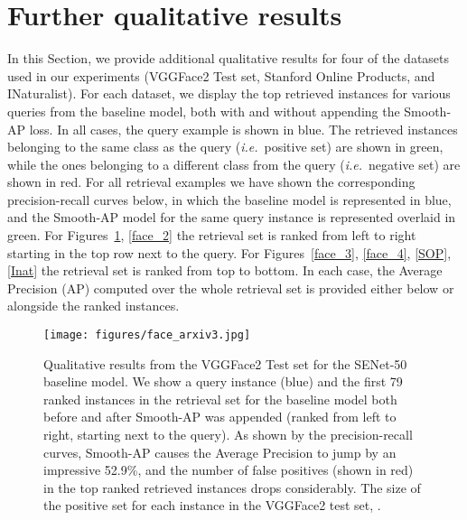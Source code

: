 \documentclass[runningheads]{llncs}
\newcommand\beforecaptions{\vspace{-3mm}}
\newcommand\aftercaptions{\vspace{-5mm}}
\providecommand{\ie}[0]{\emph{i.e.}}
\begin{document}
\section{Further qualitative results}
In this Section, we provide additional qualitative results for four of the datasets used in our experiments (VGGFace2 Test set, Stanford Online Products, and INaturalist). For each dataset, we display the top retrieved instances for various queries from the baseline model, both with and without appending the Smooth-AP loss.  
In all cases, the query example is shown in blue. The retrieved instances belonging to the same class as the query (\ie\ positive set) are shown in green, while the ones belonging to a different class from the query (\ie\ negative set) are shown in red. For all retrieval examples we have shown the corresponding precision-recall curves below, in which the baseline model is represented in blue, and the Smooth-AP model for the same query instance is represented overlaid in green. For Figures~\ref{face_1}, \ref{face_2} the retrieval set is ranked from left to right starting in the top row next to the query. For Figures~\ref{face_3}, \ref{face_4}, \ref{SOP}, \ref{Inat} the retrieval set is ranked from top to bottom. In each case, the Average Precision (AP) computed over the whole retrieval set is provided either below or alongside the ranked instances.

















\begin{figure}[htp]
\begin{center}
   \texttt{[image: figures/face\_arxiv3.jpg]}
\end{center}
\vspace{-10pt}
\beforecaptions
   \caption{\small{Qualitative results from the VGGFace2 Test set for the SENet-50~\cite{Cao18} baseline model. We show a query instance (blue) and the first 79 ranked instances in the retrieval set for the baseline model both before and after Smooth-AP was appended (ranked from left to right, starting next to the query). As shown by the precision-recall curves, Smooth-AP causes the Average Precision to jump by an impressive 52.9\%, and the number of false positives (shown in red) in the top ranked retrieved instances drops considerably. The size of the positive set for each instance in the VGGFace2 test set,  .}}
 \aftercaptions
 \vspace{-1mm}
 \label{face_1}
\end{figure}
\end{document}
